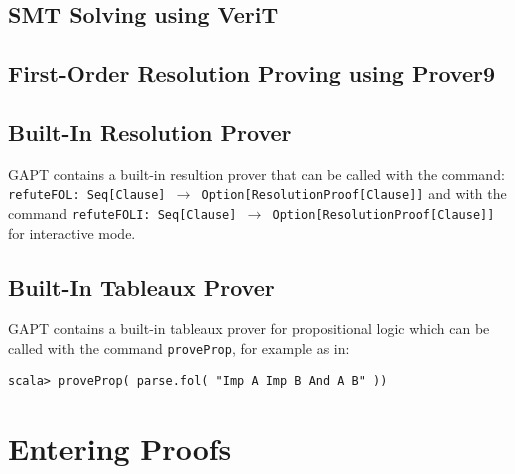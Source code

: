\documentclass[a4paper,11pt]{article}
\begin{document}
\subsection{SMT Solving using VeriT}


\subsection{First-Order Resolution Proving using Prover9}

\subsection{Built-In Resolution Prover}

GAPT contains a built-in resultion prover that can be called with the command:
\texttt{refuteFOL: Seq[Clause] $\rightarrow$ Option[ResolutionProof[Clause]]}
and with the command
\texttt{refuteFOLI: Seq[Clause] $\rightarrow$ Option[ResolutionProof[Clause]]}
for interactive mode.

\subsection{Built-In Tableaux Prover}

GAPT contains a  built-in tableaux prover for propositional logic
which can be called with the command \texttt{proveProp}, for example as in:
\begin{lstlisting}
scala> proveProp( parse.fol( "Imp A Imp B And A B" ))
\end{lstlisting}

\section{Entering Proofs}
\end{document}
